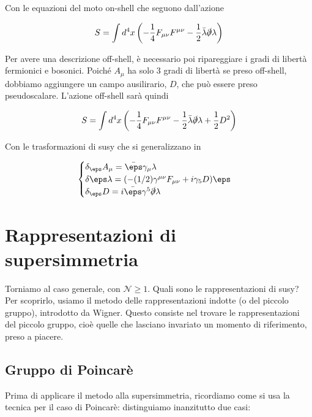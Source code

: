 \documentclass{report}
\begin{document}
Con le equazioni del moto on-shell che seguono dall'azione 

\begin{align}
    S = \int d^4x \left(-\frac{1}{4}F_{\mu\nu}F^{\mu\nu} - \frac{1}{2}\bar{\lambda}\slashed{\partial}\lambda \right)
\end{align}

Per avere una descrizione off-shell, è necessario poi ripareggiare i gradi di libertà fermionici e bosonici. Poiché \(A_\mu\) ha solo 3 gradi di libertà se preso off-shell, dobbiamo aggiungere un campo ausilirario, \(D\), che può essere preso pseudoscalare. L'azione off-shell sarà quindi 

\begin{align}
    S = \int d^4x \left(-\frac{1}{4}F_{\mu\nu}F^{\mu\nu} - \frac{1}{2}\bar{\lambda}\slashed{\partial}\lambda + \frac{1}{2}D^2 \right)
\end{align}

Con le trasformazioni di susy che si generalizzano in 

\begin{align}
    \begin{cases}
        \delta_\eps A_\mu = \bar{\eps}\gamma_\mu \lambda \\
        \delta \eps \lambda = (-(1/2)\gamma^{\mu\nu}F_{\mu\nu} + i\gamma_5 D)\eps \\ 
        \delta_\eps D = i\bar{\eps}\gamma^5 \slashed{\partial}\lambda
    \end{cases}
\end{align}

\chapter{Rappresentazioni di supersimmetria}

Torniamo al caso generale, con \(\mathcal{N} \geq 1\). Quali sono le rappresentazioni di susy? Per scoprirlo, usiamo il metodo delle rappresentazioni indotte (o del piccolo gruppo), introdotto da Wigner. Questo consiste nel trovare le rappresentazioni del piccolo gruppo, cioè quelle che lasciano invariato un momento di riferimento, preso a piacere. 

\section{Gruppo di Poincarè}

Prima di applicare il metodo alla supersimmetria, ricordiamo come si usa la tecnica per il caso di Poincarè: distinguiamo inanzitutto due casi: 
\end{document}
